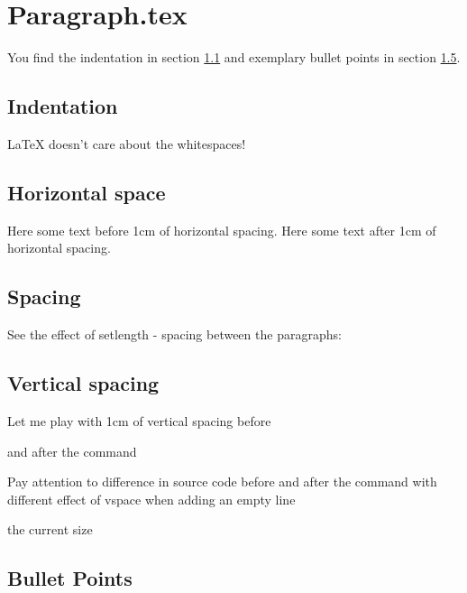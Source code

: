 \documentclass[12pt]{article}
\begin{document}

\section{Paragraph.tex}
\label{paragraph}
 You find the indentation in section \ref{indentation}
and exemplary bullet points in section \ref{bullet_points}.

\subsection{Indentation}
\label{indentation}
\LaTeX{} doesn't       care    about the      whitespaces!

\subsection{Horizontal space}
Here some text before 1cm of horizontal spacing.
\hspace{1cm} 
Here some text after 1cm of horizontal spacing.


\subsection{Spacing}

See the effect of setlength - spacing between the paragraphs: 
\setlength{\parskip}{6pt}   %
\lipsum[1-3]
\renewcommand{\baselinestretch}{2}  %


\subsection{Vertical spacing}
Let me play with 1cm of vertical spacing before
\vspace{1cm} %

and after the command 

Pay attention to difference in source code before
\vspace{1cm}
and after the command with different effect of vspace when adding an empty line


                                         the current size


\subsection{Bullet Points}
\label{bullet_points}
\end{document}
